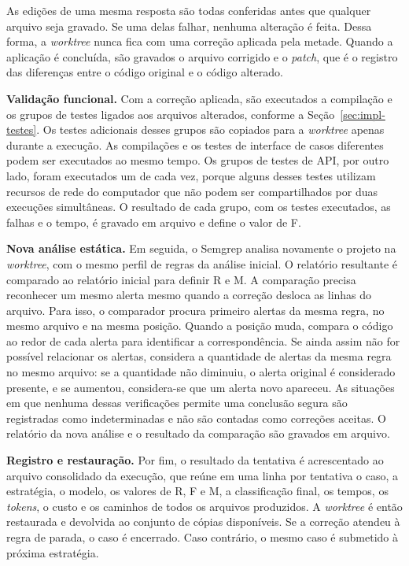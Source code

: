 As edições de uma mesma resposta são todas conferidas antes que qualquer arquivo seja gravado. Se uma delas falhar, nenhuma alteração é feita. Dessa forma, a \textit{worktree} nunca fica com uma correção aplicada pela metade. Quando a aplicação é concluída, são gravados o arquivo corrigido e o \textit{patch}, que é o registro das diferenças entre o código original e o código alterado.

\textbf{Validação funcional.} Com a correção aplicada, são executados a compilação e os grupos de testes ligados aos arquivos alterados, conforme a Seção~\ref{sec:impl-testes}. Os testes adicionais desses grupos são copiados para a \textit{worktree} apenas durante a execução. As compilações e os testes de interface de casos diferentes podem ser executados ao mesmo tempo. Os grupos de testes de API, por outro lado, foram executados um de cada vez, porque alguns desses testes utilizam recursos de rede do computador que não podem ser compartilhados por duas execuções simultâneas. O resultado de cada grupo, com os testes executados, as falhas e o tempo, é gravado em arquivo e define o valor de F.

\textbf{Nova análise estática.} Em seguida, o Semgrep analisa novamente o projeto na \textit{worktree}, com o mesmo perfil de regras da análise inicial. O relatório resultante é comparado ao relatório inicial para definir R e M. A comparação precisa reconhecer um mesmo alerta mesmo quando a correção desloca as linhas do arquivo. Para isso, o comparador procura primeiro alertas da mesma regra, no mesmo arquivo e na mesma posição. Quando a posição muda, compara o código ao redor de cada alerta para identificar a correspondência. Se ainda assim não for possível relacionar os alertas, considera a quantidade de alertas da mesma regra no mesmo arquivo: se a quantidade não diminuiu, o alerta original é considerado presente, e se aumentou, considera-se que um alerta novo apareceu. As situações em que nenhuma dessas verificações permite uma conclusão segura são registradas como indeterminadas e não são contadas como correções aceitas. O relatório da nova análise e o resultado da comparação são gravados em arquivo.

\textbf{Registro e restauração.} Por fim, o resultado da tentativa é acrescentado ao arquivo consolidado da execução, que reúne em uma linha por tentativa o caso, a estratégia, o modelo, os valores de R, F e M, a classificação final, os tempos, os \textit{tokens}, o custo e os caminhos de todos os arquivos produzidos. A \textit{worktree} é então restaurada e devolvida ao conjunto de cópias disponíveis. Se a correção atendeu à regra de parada, o caso é encerrado. Caso contrário, o mesmo caso é submetido à próxima estratégia.

